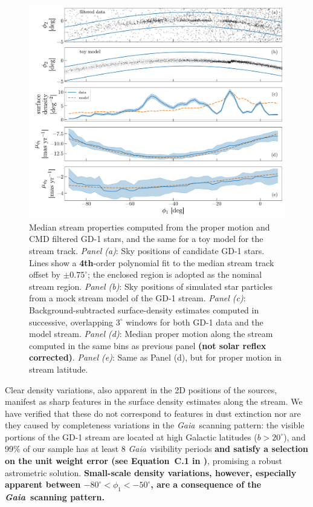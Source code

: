 \documentclass[modern]{aastex62}
\newcommand{\gaia}{\textsl{Gaia}}
\newcommand{\changes}[1]{{\textbf{#1}}}
\begin{document}
\begin{figure}
\begin{center}
\includegraphics[width=\textwidth]{track_observables.pdf}
\end{center}
\caption{%
Median stream properties computed from the proper motion and CMD filtered GD-1
stars, and the same for a toy model for the stream track.
\textit{Panel (a)}: Sky positions of candidate GD-1 stars.
Lines show a \changes{4th}-order polynomial fit to the median stream track offset by $\pm 0.75^\circ$; the enclosed region is adopted as the nominal stream region.
\textit{Panel (b)}: Sky positions of simulated star particles from a mock stream
model of the GD-1 stream.
\textit{Panel (c)}: Background-subtracted surface-density estimates computed in
successive, overlapping $3^\circ$ windows for both GD-1 data and the model
stream.
\textit{Panel (d)}: Median proper motion along the stream computed in the same
bins as previous panel \changes{(not solar reflex corrected)}.
\textit{Panel (e)}: Same as Panel (d), but for proper motion in stream latitude.
}
\label{fig:track-and-model}
\end{figure}

Clear density variations, also apparent in the 2D positions of the sources, manifest as sharp features in the surface density estimates along the stream.
We have verified that these do not correspond to features in dust extinction nor are they caused by completeness variations in the \gaia\ scanning pattern:
the visible portions of the GD-1 stream are located at high Galactic latitudes ($b > 20^\circ$), and 99\% of our sample has at least 8 \gaia\ visibility periods \changes{and satisfy a selection on the unit weight error (see Equation~C.1 in \citealt{Lindegren:2018})}, promising a robust astrometric solution.
\changes{
Small-scale density variations, however, especially apparent between $-80^\circ < \phi_1 < -50^\circ$, are a consequence of the \gaia\ scanning pattern.
}
\end{document}
